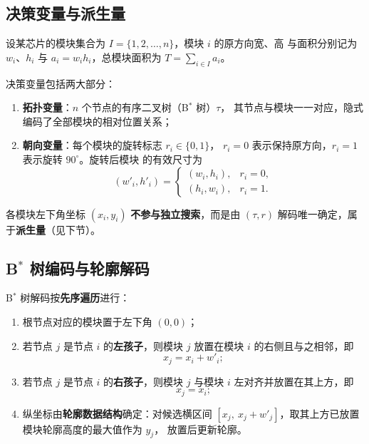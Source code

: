 \documentclass[12pt,a4paper]{article}
\begin{document}
\subsection{决策变量与派生量}

设某芯片的模块集合为 $I = \{1, 2, \dots, n\}$，模块 $i$ 的原方向宽、高
与面积分别记为 $w_i$、$h_i$ 与 $a_i = w_i h_i$，总模块面积为
$T = \sum_{i \in I} a_i$。

决策变量包括两大部分：
\begin{enumerate}
    \item \textbf{拓扑变量}：$n$ 个节点的有序二叉树（B$^*$ 树）$\tau$，
    其节点与模块一一对应，隐式编码了全部模块的相对位置关系；
    \item \textbf{朝向变量}：每个模块的旋转标志 $r_i \in \{0, 1\}$，
    $r_i = 0$ 表示保持原方向，$r_i = 1$ 表示旋转 $90^\circ$。旋转后模块
    的有效尺寸为
    \begin{equation}
    (w'_i, h'_i) = \begin{cases}
        (w_i, h_i), & r_i = 0, \\
        (h_i, w_i), & r_i = 1.
    \end{cases}
    \end{equation}
\end{enumerate}

各模块左下角坐标 $(x_i, y_i)$ \textbf{不参与独立搜索}，而是由 $(\tau, r)$
解码唯一确定，属于\textbf{派生量}（见下节）。

\subsection{B$^*$ 树编码与轮廓解码}

B$^*$ 树解码按\textbf{先序遍历}进行：
\begin{enumerate}
    \item 根节点对应的模块置于左下角 $(0, 0)$；
    \item 若节点 $j$ 是节点 $i$ 的\textbf{左孩子}，则模块 $j$ 放置在模块
    $i$ 的右侧且与之相邻，即
    \begin{equation}
    x_j = x_i + w'_i;
    \end{equation}
    \item 若节点 $j$ 是节点 $i$ 的\textbf{右孩子}，则模块 $j$ 与模块 $i$
    左对齐并放置在其上方，即
    \begin{equation}
    x_j = x_i;
    \end{equation}
    \item 纵坐标由\textbf{轮廓数据结构}确定：对候选横区间
    $[x_j,\ x_j + w'_j]$，取其上方已放置模块轮廓高度的最大值作为 $y_j$，
    放置后更新轮廓。
\end{enumerate}
\end{document}
